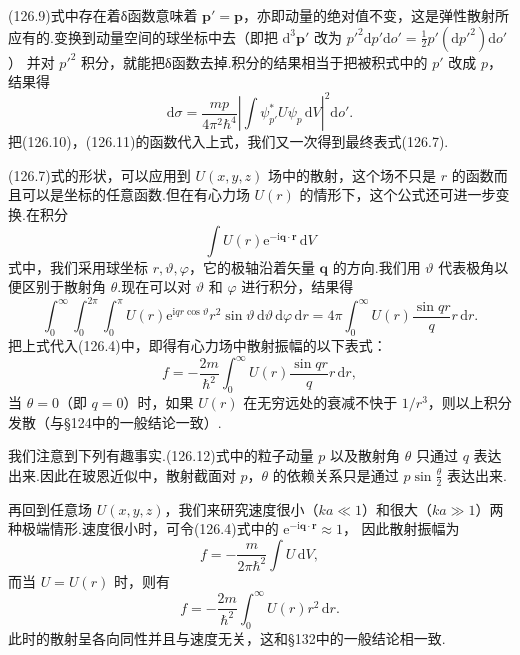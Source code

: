 (126.9)式中存在着δ函数意味着 $\boldsymbol{p}'=\boldsymbol{p}$，亦即动量的绝对值不变，这是弹性散射所应有的.变换到动量空间的球坐标中去（即把 $\mathrm{d}^3\boldsymbol{p}'$ 改为
$p'^2\mathrm{d}p'\mathrm{d}o'=\frac{1}{2}p'(\mathrm{d}p'^2)\mathrm{d}o'$）
并对 $p'^2$ 积分，就能把δ函数去掉.积分的结果相当于把被积式中的 $p'$ 改成 $p$，结果得
\begin{equation*}
  \mathrm{d}\sigma=\frac{mp}{4\pi^2\hbar^4}
  \left|\int\psi_{p'}^{*}U\psi_p\,\mathrm{d}V\right|^2\mathrm{d}o'.
\end{equation*}
把(126.10)，(126.11)的函数代入上式，我们又一次得到最终表式(126.7).

(126.7)式的形状，可以应用到 $U(x,y,z)$ 场中的散射，这个场不只是 $r$ 的函数而且可以是坐标的任意函数.但在有心力场 $U(r)$ 的情形下，这个公式还可进一步变换.在积分
\begin{equation*}
  \int U(r)\mathrm{e}^{-\mathrm{i}\boldsymbol{q}\cdot\boldsymbol{r}}\,\mathrm{d}V
\end{equation*}
式中，我们采用球坐标 $r,\vartheta,\varphi$，它的极轴沿着矢量 $\boldsymbol{q}$ 的方向.我们用 $\vartheta$ 代表极角以便区别于散射角 $\theta$.现在可以对 $\vartheta$ 和 $\varphi$ 进行积分，结果得
\begin{equation*}
  \int_0^{\infty}\!\!\int_0^{2\pi}\!\!\int_0^{\pi}
  U(r)\mathrm{e}^{\mathrm{i}qr\cos\vartheta}r^2\sin\vartheta\,
  \mathrm{d}\vartheta\,\mathrm{d}\varphi\,\mathrm{d}r
  =4\pi\int_0^{\infty}U(r)\frac{\sin qr}{q}r\,\mathrm{d}r.
\end{equation*}
把上式代入(126.4)中，即得有心力场中散射振幅的以下表式：
\begin{equation}
  f=-\frac{2m}{\hbar^2}\int_0^{\infty}U(r)\frac{\sin qr}{q}r\,\mathrm{d}r,
\end{equation}
当 $\theta=0$（即 $q=0$）时，如果 $U(r)$ 在无穷远处的衰减不快于 $1/r^3$，则以上积分发散（与§124中的一般结论一致）.

我们注意到下列有趣事实.(126.12)式中的粒子动量 $p$ 以及散射角 $\theta$ 只通过 $q$ 表达出来.因此在玻恩近似中，散射截面对 $p$，$\theta$ 的依赖关系只是通过 $p\sin\frac{\theta}{2}$ 表达出来.

再回到任意场 $U(x,y,z)$，我们来研究速度很小（$ka\ll1$）和很大（$ka\gg1$）两种极端情形.速度很小时，可令(126.4)式中的
$\mathrm{e}^{-\mathrm{i}\boldsymbol{q}\cdot\boldsymbol{r}}\approx1$，
因此散射振幅为
\begin{equation}
  f=-\frac{m}{2\pi\hbar^2}\int U\,\mathrm{d}V,
\end{equation}
而当 $U=U(r)$ 时，则有
\begin{equation}
  f=-\frac{2m}{\hbar^2}\int_0^{\infty}U(r)r^2\,\mathrm{d}r.
\end{equation}
此时的散射呈各向同性并且与速度无关，这和§132中的一般结论相一致.

